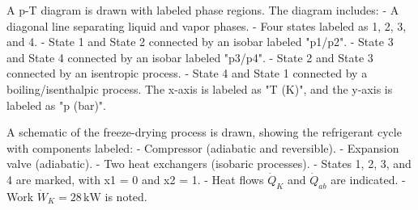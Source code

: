 A p-T diagram is drawn with labeled phase regions. The diagram includes:  
- A diagonal line separating liquid and vapor phases.  
- Four states labeled as 1, 2, 3, and 4.  
- State 1 and State 2 connected by an isobar labeled "p1/p2".  
- State 3 and State 4 connected by an isobar labeled "p3/p4".  
- State 2 and State 3 connected by an isentropic process.  
- State 4 and State 1 connected by a boiling/isenthalpic process.  
The x-axis is labeled as "T (K)", and the y-axis is labeled as "p (bar)".  

A schematic of the freeze-drying process is drawn, showing the refrigerant cycle with components labeled:  
- Compressor (adiabatic and reversible).  
- Expansion valve (adiabatic).  
- Two heat exchangers (isobaric processes).  
- States 1, 2, 3, and 4 are marked, with x1 = 0 and x2 = 1.  
- Heat flows \( \dot{Q}_K \) and \( \dot{Q}_{ab} \) are indicated.  
- Work \( \dot{W}_K = 28 \, \text{kW} \) is noted.